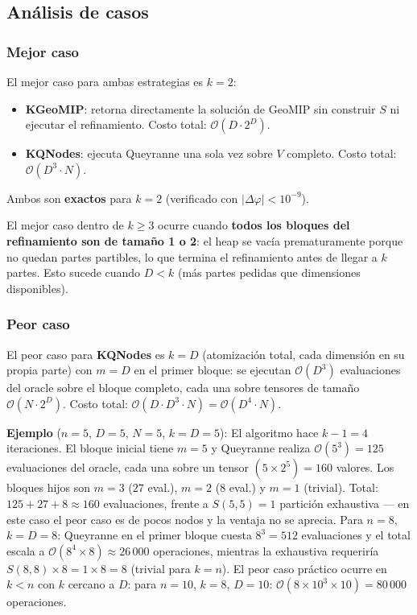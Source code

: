 \subsection{Análisis de casos}

\subsubsection*{Mejor caso}

El mejor caso para ambas estrategias es \textbf{$k = 2$}:
\begin{itemize}
  \item \textbf{KGeoMIP}: retorna directamente la solución de GeoMIP sin construir $S$
        ni ejecutar el refinamiento. Costo total: $\mathcal{O}(D \cdot 2^D)$.
  \item \textbf{KQNodes}: ejecuta Queyranne una sola vez sobre $V$ completo.
        Costo total: $\mathcal{O}(D^3 \cdot N)$.
\end{itemize}
Ambos son \textbf{exactos} para $k=2$ (verificado con $|\Delta\varphi| < 10^{-9}$).

El mejor caso dentro de $k \geq 3$ ocurre cuando \textbf{todos los bloques del
refinamiento son de tamaño 1 o 2}: el heap se vacía prematuramente porque no quedan
partes partibles, lo que termina el refinamiento antes de llegar a $k$ partes. Esto
sucede cuando $D < k$ (más partes pedidas que dimensiones disponibles).

\subsubsection*{Peor caso}

El peor caso para \textbf{KQNodes} es $k = D$ (atomización total, cada dimensión en su
propia parte) con $m = D$ en el primer bloque: se ejecutan $\mathcal{O}(D^3)$
evaluaciones del oracle sobre el bloque completo, cada una sobre tensores de tamaño
$\mathcal{O}(N \cdot 2^D)$. Costo total: $\mathcal{O}(D \cdot D^3 \cdot N) = \mathcal{O}(D^4 \cdot N)$.

\smallskip
\noindent\textbf{Ejemplo} ($n = 5$, $D = 5$, $N = 5$, $k = D = 5$):
El algoritmo hace $k-1 = 4$ iteraciones. El bloque inicial tiene $m=5$ y Queyranne
realiza $\mathcal{O}(5^3) = 125$ evaluaciones del oracle, cada una sobre un tensor
$(5 \times 2^5) = 160$ valores. Los bloques hijos son $m=3$ ($27$ eval.), $m=2$ ($8$
eval.) y $m=1$ (trivial). Total: $125 + 27 + 8 \approx 160$ evaluaciones, frente a
$S(5,5) = 1$ partición exhaustiva — en este caso el peor caso es de pocos nodos y la
ventaja no se aprecia. Para $n = 8$, $k = D = 8$: Queyranne en el primer bloque cuesta
$8^3 = 512$ evaluaciones y el total escala a $\mathcal{O}(8^4 \times 8) \approx 26\,000$
operaciones, mientras la exhaustiva requeriría $S(8,8) \times 8 = 1 \times 8 = 8$ (trivial
para $k=n$). El peor caso práctico ocurre en $k < n$ con $k$ cercano a $D$:
para $n=10$, $k=8$, $D=10$: $\mathcal{O}(8 \times 10^3 \times 10) = 80\,000$ operaciones.

